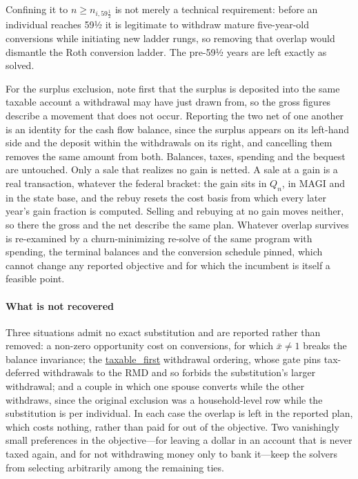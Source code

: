 \documentclass[fleqn,12pt]{report}
\newcommand{\code}[1]{\url{#1}}
\begin{document}
	Confining it to $n \ge n_{i,59\frac{1}{2}}$ is not merely a technical requirement: before
	an individual reaches 59½ it is legitimate to withdraw mature five-year-old conversions
	while initiating new ladder rungs, so removing that overlap would dismantle the Roth
	conversion ladder. The pre-59½ years are left exactly as solved.

	For the surplus exclusion, note first that the surplus is deposited into the same taxable
	account a withdrawal may have just drawn from, so the gross figures describe a movement
	that does not occur. Reporting the two net of one another is an identity for the cash flow
	balance, since the surplus appears on its left-hand side and the deposit within the
	withdrawals on its right, and cancelling them removes the same amount from both. Balances,
	taxes, spending and the bequest are untouched. Only a sale that realizes no gain is
	netted. A sale at a gain is a real transaction, whatever the federal bracket: the gain
	sits in $Q_n$, in MAGI and in the state base, and the rebuy resets the cost basis from
	which every later year's gain fraction is computed. Selling and rebuying at no gain moves
	neither, so there the gross and the net describe the same plan. Whatever overlap survives is re-examined by a
	churn-minimizing re-solve of the same program with spending, the terminal balances and the
	conversion schedule pinned, which cannot change any reported objective and for which the
	incumbent is itself a feasible point.

	\paragraph*{What is not recovered}
	Three situations admit no exact substitution and are reported rather than removed:
	a non-zero opportunity cost on conversions, for which $\bar{x} \neq 1$ breaks the balance
	invariance; the \code{taxable_first} withdrawal ordering, whose gate pins tax-deferred
	withdrawals to the RMD and so forbids the substitution's larger withdrawal; and a couple
	in which one spouse converts while the other withdraws, since the original exclusion was
	a household-level row while the substitution is per individual. In each case the overlap
	is left in the reported plan, which costs nothing, rather than paid for out of the
	objective. Two vanishingly small preferences in the objective---for leaving a dollar in an
	account that is never taxed again, and for not withdrawing money only to bank it---keep
	the solvers from selecting arbitrarily among the remaining ties.
\end{document}
